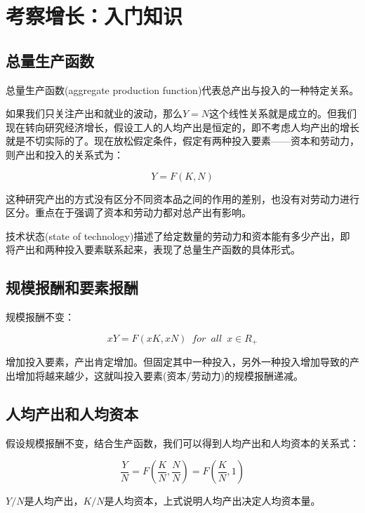 \documentclass{article}
\begin{document}
\section{考察增长：入门知识}

\subsection{总量生产函数}

总量生产函数(aggregate production function)代表总产出与投入的一种特定关系。

如果我们只关注产出和就业的波动，那么$ Y=N $这个线性关系就是成立的。但我们现在转向研究经济增长，假设工人的人均产出是恒定的，即不考虑人均产出的增长就是不切实际的了。现在放松假定条件，假定有两种投入要素——资本和劳动力，则产出和投入的关系式为：

\[
Y=F(K,N)
\]

这种研究产出的方式没有区分不同资本品之间的作用的差别，也没有对劳动力进行区分。重点在于强调了资本和劳动力都对总产出有影响。

技术状态(state of technology)描述了给定数量的劳动力和资本能有多少产出，即将产出和两种投入要素联系起来，表现了总量生产函数的具体形式。

\subsection{规模报酬和要素报酬}

规模报酬不变：

\[
xY=F(xK,xN)\enspace for\enspace all\enspace x\in R_+
\]

增加投入要素，产出肯定增加。但固定其中一种投入，另外一种投入增加导致的产出增加将越来越少，这就叫投入要素(资本/劳动力)的规模报酬递减。

\subsection{人均产出和人均资本}

假设规模报酬不变，结合生产函数，我们可以得到人均产出和人均资本的关系式：

\[
\frac{Y}{N}=F(\frac{K}{N},\frac{N}{N})=F(\frac{K}{N},1)
\]

$ Y/N $是人均产出，$ K/N $是人均资本，上式说明人均产出决定人均资本量。
\end{document}
